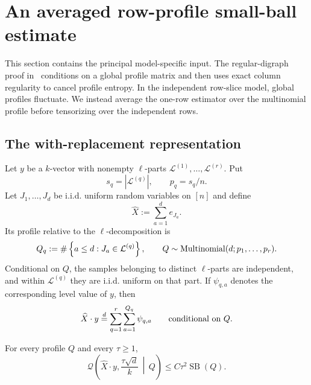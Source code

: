 \section{An averaged row-profile small-ball estimate}\label{sec:profiles}

This section contains the principal model-specific input. The regular-digraph proof in~\cite{LLTTY19} conditions on a global profile matrix and then uses exact column regularity to cancel profile entropy. In the independent row-slice model, global profiles fluctuate. We instead average the one-row estimator over the multinomial profile before tensorizing over the independent rows.

\subsection{The with-replacement representation}

Let $y$ be a $k$-vector with nonempty $\ell$-parts $\mathcal L^{(1)},\ldots,\mathcal L^{(r)}$. Put
\[
  s_q=|\mathcal L^{(q)}|,
  \qquad
  p_q=s_q/n.
\]
Let $J_1,\ldots,J_d$ be i.i.d. uniform random variables on $[n]$ and define
\[
  \widehat X:=\sum_{a=1}^d e_{J_a}.
\]
Its profile relative to the $\ell$-decomposition is
\[
  Q_q:=\#\left\{a\le d:J_a\in\mathcal L^{(q)}\right\},
  \qquad
  Q\sim\operatorname{Multinomial}(d;p_1,\ldots,p_r).
\]
Conditional on $Q$, the samples belonging to distinct $\ell$-parts are independent, and within $\mathcal L^{(q)}$ they are i.i.d. uniform on that part. If $\psi_{q,a}$ denotes the corresponding level value of $y$, then
\begin{equation}\label{eq:conditional-block-sum}
  \widehat X\cdot y
  \stackrel{d}{=}
  \sum_{q=1}^r\sum_{a=1}^{Q_q}\psi_{q,a}
  \qquad\text{conditional on }Q.
\end{equation}

\begin{lemma}\label{lem:conditional-row-small-ball}
For every profile $Q$ and every $\tau\ge1$,
\[
  \mathcal Q\!\left(\widehat X\cdot y,\frac{\tau\sqrt d}{k}\,\middle|\,Q\right)
  \le C\tau^2\operatorname{SB}(Q).
\]
\end{lemma}

